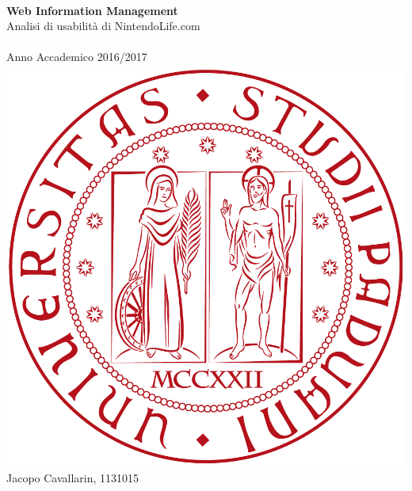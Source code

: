 \documentclass[12pt, a4paper,titlepage]{article}
\begin{document}
\begin{titlepage}
\HRule \\[0.4cm]
{ \huge \textbf{Web Information Management}\\[0.4cm] Analisi di usabilità di NintendoLife.com}\\[0.4cm] %
\HRule \\[0.5cm]
\large{Anno Accademico 2016/2017}\\[1cm]
\includegraphics[scale=0.3]{logo}\\[1cm] %
Jacopo Cavallarin, 1131015
\vspace*{\fill}





\vfill %

\end{titlepage}
\newpage
\tableofcontents
\listoffigures
\thispagestyle{empty}
\clearpage
{}
\pagestyle{fancy}
\end{document}
